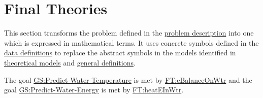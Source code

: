 \documentclass[12pt]{article}
\begin{document}

\section{Final Theories}
\label{Sec:FTs}
This section transforms the problem defined in the
\hyperref[Sec:ProbDesc]{problem description} into one which is expressed in
mathematical terms. It uses concrete symbols defined in the
\hyperref[Sec:DDs]{data definitions} to replace the abstract symbols in the
models identified in \hyperref[Sec:BTs]{theoretical models} and
\hyperref[Sec:RefndTheories]{general definitions}.

The goal \hyperref[waterTempGS]{GS:Predict-Water-Temperature} is met by
\hyperref[FT:eBalanceOnWtr]{FT:eBalanceOnWtr} and the goal
\hyperref[waterEnergyGS]{GS:Predict-Water-Energy} is met by
\hyperref[FT:heatEInWtr]{FT:heatEInWtr}.

\end{document}
